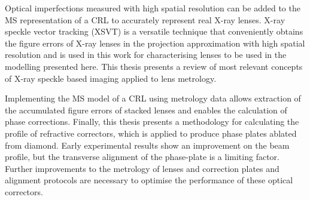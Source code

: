 Optical imperfections measured with high spatial resolution can be added to the MS representation of a CRL to accurately represent real X-ray lenses. X-ray speckle vector tracking (XSVT) is a versatile technique that conveniently obtains the figure errors of X-ray lenses in the projection approximation with high spatial resolution and is used in this work for characterising lenses to be used in the modelling presented here. This thesis presents a review of most relevant concepts of X-ray speckle based imaging applied to lens metrology.

Implementing the MS model of a CRL using metrology data allows extraction of the accumulated figure errors of stacked lenses and enables the calculation of phase corrections. Finally, this thesis presents a methodology for calculating the profile of refractive correctors, which is applied to produce phase plates ablated from diamond. Early experimental results show an improvement on the beam profile, but the transverse alignment of the phase-plate is a limiting factor. Further improvements to the metrology of lenses and correction plates and alignment protocols are necessary to optimise the performance of these optical correctors.
